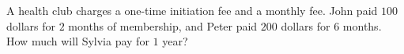 A health club charges a one-time initiation fee and a monthly fee. John paid $100$ dollars for $2$ months of membership, and Peter paid $200$ dollars for $6$ months. How much will Sylvia pay for $1$ year?
